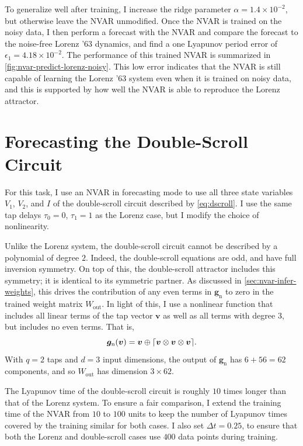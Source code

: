 To generalize well after training, I increase the ridge parameter
$\alpha = 1.4\times10^{-2}$, but otherwise leave the NVAR
unmodified. Once the NVAR is trained on the noisy data, I then perform
a forecast with the NVAR and compare the forecast to the noise-free
Lorenz '63 dynamics, and find a one Lyapunov period error of
$\epsilon_1 = 4.18\times10^{-2}$. The performance of this trained NVAR
is summarized in \cref{fig:nvar-predict-lorenz-noisy}. This low error
indicates that the NVAR is still capable of learning the Lorenz '63
system even when it is trained on noisy data, and this is supported by
how well the NVAR is able to reproduce the Lorenz attractor.

\section{Forecasting the Double-Scroll Circuit}

For this task, I use an NVAR in forecasting mode to use all
three state variables $V_1$, $V_2$, and $I$ of the double-scroll
circuit described by \cref{eq:dscroll}. I use the same tap
delays $\tau_0 = 0$, $\tau_1 = 1$ as the Lorenz case, but I modify
the choice of nonlinearity.

Unlike the Lorenz system, the double-scroll circuit cannot be
described by a polynomial of degree $2$. Indeed, the double-scroll
equations are odd, and have full inversion symmetry. On top of this,
the double-scroll attractor includes this symmetry; it is identical to
its symmetric partner. As discussed in \cref{sec:nvar-infer-weights},
this drives the contribution of any even terms in $\bm{g}_\text{n}$ to
zero in the trained weight matrix $W_\text{out}$. In light of this, I
use a nonlinear function that includes all linear terms of the tap
vector $\bm{v}$ as well as all terms with degree $3$, but includes no
even terms. That is,
\begin{equation}
  \bm{g}_\text{n}(\bm{v}) = \bm{v} \oplus \lceil\bm{v} \otimes \bm{v} \otimes \bm{v}\rceil.
\end{equation}
With $q = 2$ taps and $d = 3$ input dimensions, the output of
$\bm{g}_\text{n}$ has $6 + 56 = 62$ components, and so $W_\text{out}$
has dimension $3 \times 62$.

The Lyapunov time of the double-scroll circuit is roughly $10$ times
longer than that of the Lorenz system. To ensure a fair comparison, I
extend the training time of the NVAR from $10$ to $100$ units to keep
the number of Lyapunov times covered by the training similar for both
cases. I also set $\Delta t = 0.25$, to ensure that both the Lorenz
and double-scroll cases use $400$ data points during training.


